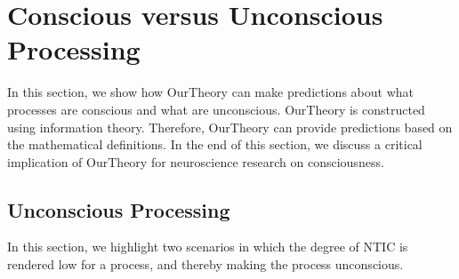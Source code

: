 \documentclass[utf8]{article}
\begin{document}
	\section{Conscious versus Unconscious Processing}\label{sec:Conscious versus Unconscious Processing}
	    In this section, we show how \ac{OurTheory} can make predictions about what processes are conscious and what are unconscious. \ac{OurTheory} is constructed using information theory. Therefore, \ac{OurTheory} can provide predictions based on the mathematical definitions. In the end of this section, we discuss a critical implication of \ac{OurTheory} for neuroscience research on consciousness.  
	    
	    
        
		
		
		
        \subsection{Unconscious Processing}
            In this section, we highlight two scenarios in which the degree of NTIC is rendered low for a process, and thereby making the process unconscious.
        
\end{document}

